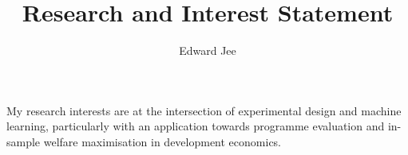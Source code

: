 \documentclass{article}
\author{Edward Jee}
\title{Research and Interest Statement}
\begin{document}
\maketitle

My research interests are at the intersection of experimental design and machine 
learning, particularly with an application towards programme evaluation and 
in-sample welfare maximisation in development economics.



    
\end{document}
